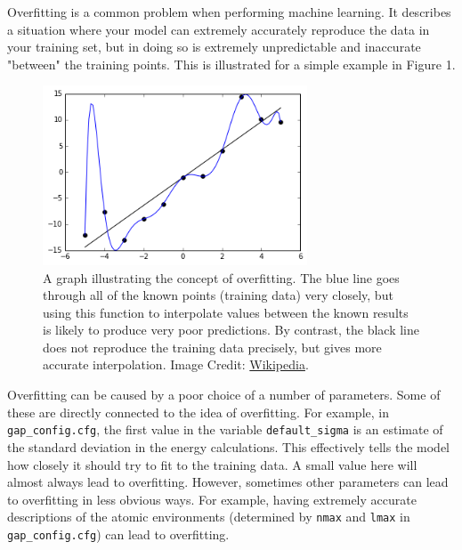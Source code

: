 \documentclass{article}
\begin{document}

Overfitting is a common problem when performing machine learning. It describes a situation where your model can extremely accurately reproduce the data in your training set, but in doing so is extremely unpredictable and inaccurate "between" the training points. This is illustrated for a simple example in Figure 1.

\begin{figure}[t]

\centering

\includegraphics[width=0.7\textwidth]{Overfitted_Data.png}
\caption{A graph illustrating the concept of overfitting. The blue line goes through all of the known points (training data) very closely, but using this function to interpolate values between the known results is likely to produce very poor predictions. By contrast, the black line does not reproduce the training data precisely, but gives more accurate interpolation. Image Credit: \href{https://en.wikipedia.org/wiki/Overfitting}{Wikipedia}.}

\end{figure}

Overfitting can be caused by a poor choice of a number of parameters. Some of these are directly connected to the idea of overfitting. For example, in \verb|gap_config.cfg|, the first value in the variable \verb|default_sigma| is an estimate of the standard deviation in the energy calculations. This effectively tells the model how closely it should try to fit to the training data. A small value here will almost always lead to overfitting. However, sometimes other parameters can lead to overfitting in less obvious ways. For example, having extremely accurate descriptions of the atomic environments (determined by \verb|nmax| and \verb|lmax| in \verb|gap_config.cfg|) can lead to overfitting.
\end{document}
